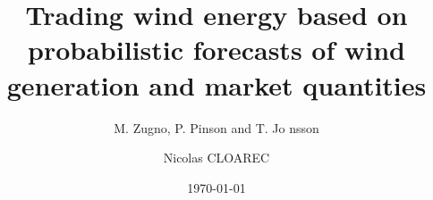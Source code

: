 \documentclass{beamer}
\begin{document}
\title{Trading wind energy based on probabilistic forecasts of wind generation and market quantities}
\subtitle{M. Zugno, P. Pinson and T. Jo nsson}
\author{Nicolas CLOAREC}
\date{\today}


\end{document}
